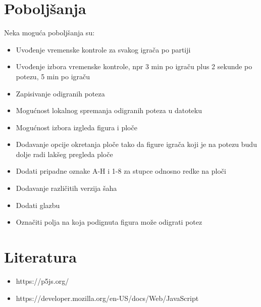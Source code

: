 \documentclass[11pt]{article}
\begin{document}
\section{Poboljšanja}
Neka moguća poboljšanja su:
\begin{itemize}
    \item Uvođenje vremenske kontrole za svakog igrača po partiji
    \item Uvođenje izbora vremenske kontrole, npr 3 min po igraču plus 2 sekunde po potezu, 5 min po igraču
    \item Zapisivanje odigranih poteza
    \item Mogućnost lokalnog spremanja odigranih poteza u datoteku
    \item Mogućnost izbora izgleda figura i ploče
    \item Dodavanje opcije okretanja ploče tako da figure igrača koji je na potezu budu dolje radi lakšeg pregleda ploče
    \item Dodati pripadne oznake A-H i 1-8 za stupce odnosno redke na ploči
    \item Dodavanje različitih verzija šaha
    \item Dodati glazbu
    \item Označiti polja na koja podignuta figura može odigrati potez
\end{itemize} 

\section{Literatura}
\begin{itemize}
    \item https://p5js.org/
    \item https://developer.mozilla.org/en-US/docs/Web/JavaScript
\end{itemize}
\end{document}
